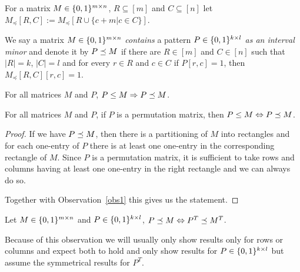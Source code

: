 \begin{ntn}
For a matrix $M\in\{0,1\}^{m\times n}$, $R\subseteq[m]$ and $C\subseteq[n]$ let $M_{\preceq}[R,C]:=M_{\preceq}[R\cup \{c+m|c\in C\}]$.
\end{ntn}
\begin{defn}
We say a matrix $M\in\{0,1\}^{m\times n}$ \emph{contains} a pattern $P\in\{0,1\}^{k\times l}$ \emph{as an interval minor} and denote it by $P\preceq M$ if there are $R\in[m]$ and $C\in[n]$ such that $|R|=k$, $|C|=l$ and for every $r\in R$ and $c\in C$ if $P[r,c]=1$, then $M_{\preceq}[R,C][r,c]=1$.
\end{defn}
%
%
%
\begin{obs}
\label{obs1}
For all matrices $M$ and $P$, $P\leq M\Rightarrow P\preceq M$.
\end{obs}
\begin{obs}
For all matrices $M$ and $P$, if $P$ is a permutation matrix, then $P\leq M\Leftrightarrow P\preceq M$.
\end{obs}
\begin{proof}
If we have $P\preceq M$, then there is a partitioning of $M$ into rectangles and for each one-entry of $P$ there is at least one one-entry in the corresponding rectangle of $M$. Since $P$ is a permutation matrix, it is sufficient to take rows and columns having at least one one-entry in the right rectangle and we can always do so.

Together with Observation~\ref{obs1} this gives us the statement.
\end{proof}
\begin{obs}
Let $M\in\{0,1\}^{m\times n}$ and $P\in\{0,1\}^{k\times l}$, $P\preceq M\Leftrightarrow P^T\preceq M^T$.
\end{obs}
Because of this observation we will usually only show results only for rows or columns and expect both to hold and only show results for $P\in\{0,1\}^{k\times l}$ but assume the symmetrical results for $P^T$.